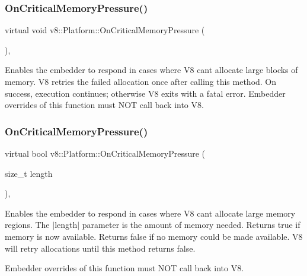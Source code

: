 \subsubsection{\texorpdfstring{On\+Critical\+Memory\+Pressure()}{OnCriticalMemoryPressure()}\hspace{0.1cm}{\footnotesize\ttfamily [1/2]}}
{\footnotesize\ttfamily virtual void v8\+::\+Platform\+::\+On\+Critical\+Memory\+Pressure (\begin{DoxyParamCaption}{ }\end{DoxyParamCaption})\hspace{0.3cm}{\ttfamily [inline]}, {\ttfamily [virtual]}}

Enables the embedder to respond in cases where V8 can\textquotesingle{}t allocate large blocks of memory. V8 retries the failed allocation once after calling this method. On success, execution continues; otherwise V8 exits with a fatal error. Embedder overrides of this function must N\+OT call back into V8. \mbox{\label{classv8_1_1Platform_a0de4b8a7bb8865ce65beb5afbaabe4cc}} 
\subsubsection{\texorpdfstring{On\+Critical\+Memory\+Pressure()}{OnCriticalMemoryPressure()}\hspace{0.1cm}{\footnotesize\ttfamily [2/2]}}
{\footnotesize\ttfamily virtual bool v8\+::\+Platform\+::\+On\+Critical\+Memory\+Pressure (\begin{DoxyParamCaption}\item[{size\+\_\+t}]{length }\end{DoxyParamCaption})\hspace{0.3cm}{\ttfamily [inline]}, {\ttfamily [virtual]}}

Enables the embedder to respond in cases where V8 can\textquotesingle{}t allocate large memory regions. The $\vert$length$\vert$ parameter is the amount of memory needed. Returns true if memory is now available. Returns false if no memory could be made available. V8 will retry allocations until this method returns false.

Embedder overrides of this function must N\+OT call back into V8. \mbox{\label{classv8_1_1Platform_a18ccdaf3a1a738bd4082dbbe749d026b}} 
